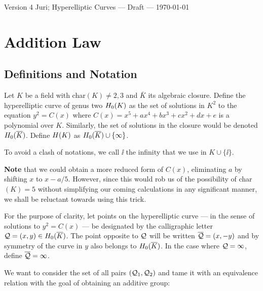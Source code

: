 \documentclass[english,11pt,a4paper]{article}
\begin{document}

Version 4 \scriptsize \hfill Juri; Hyperelliptic Curves --- Draft --- \today
\normalsize

\section{Addition Law}

\subsection{Definitions and Notation}

\begin{defin}
	Let $K$ be a field with char$(K) \neq 2, 3$ and $\bar K$ its algebraic closure. Define the hyperelliptic curve of genus two $H_0(K)$ as the set of solutions in $K^2$ to the equation $y^2=C(x)$ where $C(x)=x^5+ax^4+bx^3+cx^2+dx+e$ is a polynomial over $K$. Similarly, the set of solutions in the closure would be denoted $H_0(\overline K)$.	Define $H(K)$ as $H_0(\overline K) \cup \{ \infty \}$.

	To avoid a clash of notations, we call $\ii$ the infinity that we use in $K \cup \{ \ii \}.$

	\textbf{Note} that we could obtain a more reduced form of $C(x)$, eliminating $a$ by shifting $x$ to $x-a/5$. However, since this would rob us of the possibility of char$(K) = 5$ without simplifying our coming calculations in any significant manner, we shall be reluctant towards using this trick.

	For the purpose of clarity, let points on the hyperelliptic curve --- in the sense of solutions to $y^2=C(x)$ --- be designated by the calligraphic letter $\mathcal{Q}=(x,y) \in H_0(\overline K)$. The point opposite to $\mathcal{Q}$ will be written $\overline {\mathcal{Q}} = (x,-y)$ and by symmetry of the curve in $y$ also belongs to $H_0(\overline K)$. In the case where $\mathcal{Q} = \infty$, define $\overline {\mathcal{Q}} = \infty$.

	We want to consider the set of all pairs $(\mathcal{Q}_1,\mathcal{Q}_2)$ and tame it with an equivalence relation with the goal of obtaining an additive group:
\end{defin}
\end{document}
